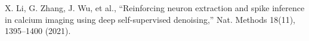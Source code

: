 X. Li, G. Zhang, J. Wu, et al., “Reinforcing neuron extraction and spike inference in calcium imaging using deep self-supervised denoising,” Nat. Methods 18(11), 1395–1400 (2021).

